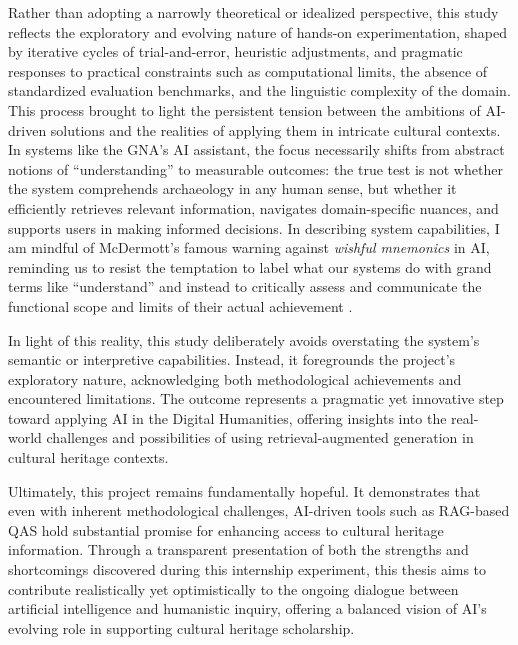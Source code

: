 \begin{spacing}{1.5}
Rather than adopting a narrowly theoretical or idealized perspective, this study reflects the exploratory and evolving nature of hands-on experimentation, shaped by iterative cycles of trial-and-error, heuristic adjustments, and pragmatic responses to practical constraints such as computational limits, the absence of standardized evaluation benchmarks, and the linguistic complexity of the domain. This process brought to light the persistent tension between the ambitions of AI-driven solutions and the realities of applying them in intricate cultural contexts. In systems like the GNA’s AI assistant, the focus necessarily shifts from abstract notions of “understanding” to measurable outcomes: the true test is not whether the system comprehends archaeology in any human sense, but whether it efficiently retrieves relevant information, navigates domain-specific nuances, and supports users in making informed decisions. In describing system capabilities, I am mindful of McDermott’s famous warning against \textit{wishful mnemonics} in AI, reminding us to resist the temptation to label what our systems do with grand terms like “understand” and instead to critically assess and communicate the functional scope and limits of their actual achievement \citep{mcdermott_artificial_1976}.

In light of this reality, this study deliberately avoids overstating the system’s semantic or interpretive capabilities. Instead, it foregrounds the project’s exploratory nature, acknowledging both methodological achievements and encountered limitations. The outcome represents a pragmatic yet innovative step toward applying AI in the Digital Humanities, offering insights into the real-world challenges and possibilities of using retrieval-augmented generation in cultural heritage contexts.

Ultimately, this project remains fundamentally hopeful. It demonstrates that even with inherent methodological challenges, AI-driven tools such as RAG-based QAS hold substantial promise for enhancing access to cultural heritage information. Through a transparent presentation of both the strengths and shortcomings discovered during this internship experiment, this thesis aims to contribute realistically yet optimistically to the ongoing dialogue between artificial intelligence and humanistic inquiry, offering a balanced vision of AI’s evolving role in supporting cultural heritage scholarship.

\end{spacing}